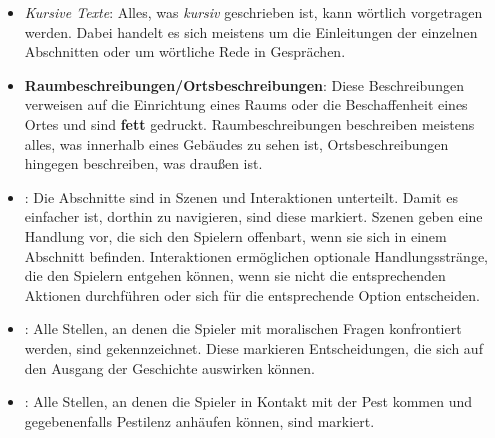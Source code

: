\begin{itemize}
  \item \textit{Kursive Texte}:
  Alles, was \textit{kursiv} geschrieben ist, kann wörtlich vorgetragen werden. Dabei handelt es sich meistens um die Einleitungen der einzelnen Abschnitten oder um wörtliche Rede in Gesprächen.

  \item \textbf{Raumbeschreibungen/Ortsbeschreibungen}:
  Diese Beschreibungen verweisen auf die Einrichtung eines Raums oder die Beschaffenheit eines Ortes und sind \textbf{fett} gedruckt. Raumbeschreibungen beschreiben meistens alles, was innerhalb eines Gebäudes zu sehen ist, Ortsbeschreibungen hingegen beschreiben, was draußen ist.

  \item {}:
  Die Abschnitte sind in Szenen und Interaktionen unterteilt. Damit es einfacher ist, dorthin zu navigieren, sind diese  markiert. Szenen geben eine Handlung vor, die sich den Spielern offenbart, wenn sie sich in einem Abschnitt befinden. Interaktionen ermöglichen optionale Handlungsstränge, die den Spielern entgehen können, wenn sie nicht die entsprechenden Aktionen durchführen oder sich für die entsprechende Option entscheiden.

  \item {}:
  Alle Stellen, an denen die Spieler mit moralischen Fragen konfrontiert werden, sind  gekennzeichnet. Diese markieren Entscheidungen, die sich auf den Ausgang der Geschichte auswirken können.

  \item {}:
  Alle Stellen, an denen die Spieler in Kontakt mit der Pest kommen und gegebenenfalls Pestilenz anhäufen können, sind  markiert.
\end{itemize}
